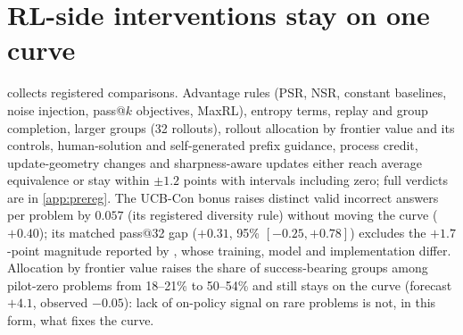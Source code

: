 \documentclass{article}
\theoremstyle{plain}
\begin{document}
\section{RL-side interventions stay on one curve}\label{sec:rl}
 collects registered comparisons. Advantage rules (PSR, NSR, constant baselines, noise injection, pass@$k$
objectives, MaxRL), entropy terms, replay and group completion, larger groups (32 rollouts), rollout allocation by
frontier value and its controls, human-solution and self-generated prefix guidance, process credit, update-geometry
changes and sharpness-aware updates either reach average equivalence or stay within $\pm1.2$ points with intervals
including zero; full verdicts are in \cref{app:prereg}. The UCB-Con bonus raises distinct valid incorrect answers per
problem by $0.057$ (its registered diversity rule) without moving the curve ($+0.40$); its matched pass@32 gap
($+0.31$, 95\% $[-0.25,+0.78]$) excludes the $+1.7$-point magnitude reported by \citet{song2025outcome}, whose
training, model and implementation differ. Allocation by frontier value raises the share of success-bearing groups
among pilot-zero problems from 18--21\% to 50--54\% and still stays on the curve (forecast $+4.1$, observed $-0.05$):
lack of on-policy signal on rare problems is not, in this form, what fixes the curve.

\begin{table}[t]
\caption{Registered matched-pass@1 differences in pass@16 (points; 95\% intervals unless marked 90\%). Reference:
Dr.\ GRPO (B) trajectory or trajectory-and-temperature envelope. 1.5B unless stated.}
\label{tab:rl}
\centering\small
{}
\end{table}
\end{document}
